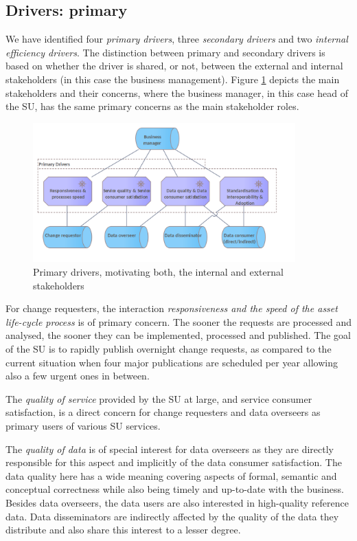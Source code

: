 	\subsection{Drivers: primary}
	
	We have identified four \textit{primary drivers}, three \textit{secondary drivers} and two \textit{internal efficiency drivers}. The distinction between primary and secondary drivers is based on whether the driver is shared, or not, between the external and internal stakeholders (in this case the business management).
	Figure \ref{fig:primary-drivers} depicts the main stakeholders and their concerns, where the business manager, in this case head of the SU, has the same primary concerns as the main stakeholder roles.
	
	\begin{figure}[hbt!]
		\centering
		\includegraphics[width=0.9\textwidth]{images/motivation/Primary drivers.png}
		\caption{Primary drivers, motivating both, the internal and external stakeholders}
		\label{fig:primary-drivers}
	\end{figure}
	
	For change requesters, the interaction \textit{responsiveness and the speed of the asset life-cycle process} is of primary concern. The sooner the requests are processed and analysed, the sooner they can be implemented, processed and published. The goal of the SU is to rapidly publish overnight change requests, as compared to the current situation when four major publications are scheduled per year allowing also a few urgent ones in between.
	
	The \textit{quality of service} provided by the SU at large, and service consumer satisfaction, is a direct concern for change requesters and data overseers as primary users of various SU services. 
	
	The \textit{quality of data} is of special interest for data overseers as they are directly responsible for this aspect and implicitly of the data consumer satisfaction. The data quality here has a wide meaning covering aspects of formal, semantic and conceptual correctness while also being timely and up-to-date with the business. Besides data overseers, the data users are also interested in high-quality reference data. Data disseminators are indirectly affected by the quality of the data they distribute and also share this interest to a lesser degree. 
	
